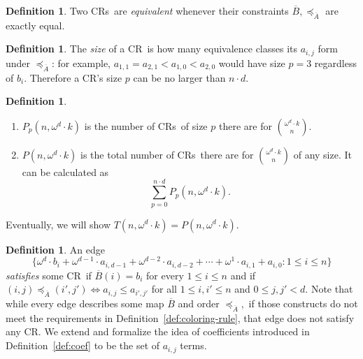 \documentclass[10pt,a4paper]{article}
\newcommand{\om}{\omega}
\newcommand{\crulenospace}{CR}
\newcommand{\crule}{\crulenospace~}
\newcommand{\crules}{\crulenospace s~}
\newcommand{\xleq}{\preceq_{\overline{A}}}
\newcommand{\assny}{\overline{B}}
\newcommand{\numpoints}{n}
\newcommand{\inumpoints}{i}
\newcommand{\idegr}{j}
\newcommand{\commonconst}{a}
\newcommand{\rareconst}{b}
\theoremstyle{plain}
\theoremstyle{definition}
\newtheorem{definition}[theorem]{Definition}
\begin{document}
\begin{definition}\label{def:crule-equivalence}
    Two \crules are \textit{equivalent} whenever their constraints $\assny, \xleq$ are
    exactly equal.
\end{definition}

\begin{definition} 
The \textit{size} of a \crule is how many equivalence classes its $\commonconst_{\inumpoints,\idegr}$ form under $\xleq$: 
for example, $\commonconst_{1, 1} = \commonconst_{2, 1} < \commonconst_{1, 0} < \commonconst_{2, 0}$ would have size $p=3$ regardless of $\rareconst_{\inumpoints}$. Therefore a \crulenospace's size $p$ can be no larger than $\numpoints \cdot d$.
\end{definition}
\begin{definition}~
\begin{enumerate}
\item 
$P_p \left(\numpoints,\om^d \cdot k \right)$ is the number of \crules of size $p$ there are for $\binom{\omega^d \cdot k}{\numpoints}$. 
\item 
$P\left(\numpoints,\om^d \cdot k\right)$ is the total number of \crules there are for $\binom{\omega^d \cdot k}{\numpoints}$ of any size. It can be calculated as $$
\sum_{p=0}^{\numpoints \cdot d} P_p(\numpoints, \om^d \cdot k).
$$
\end{enumerate}
\end{definition}
Eventually,
we will show $T(\numpoints,\om^d \cdot k) = P(\numpoints,\om^d \cdot k)$.

\begin{definition}\label{def:crule-coef}
An edge $$\{\om^d \cdot \rareconst_{\inumpoints} + \om^{d-1} \cdot \commonconst_{\inumpoints,d-1} + \om^{d-2} \cdot \commonconst_{\inumpoints,d-2} + \cdots + \om^1 \cdot \commonconst_{\inumpoints,1} + \commonconst_{\inumpoints,0} \colon 1 \leq \inumpoints \leq \numpoints\}$$
\textit{satisfies} some \crule if $\assny(\inumpoints) = \rareconst_{\inumpoints}$ for every $1 \leq \inumpoints \leq \numpoints$ and if 
$(\inumpoints,\idegr) \xleq (\inumpoints',\idegr') \iff \commonconst_{\inumpoints,\idegr} \leq \commonconst_{\inumpoints',\idegr'}$ for all $1 \leq \inumpoints,\inumpoints' \leq \numpoints$ and $0 \leq \idegr, \idegr' < d.$
Note that while every edge describes some map $\assny$ and order $\xleq,$ if those constructs
do not meet the requirements in Definition~\ref{def:coloring-rule},
that edge does not satisfy any \crulenospace. We extend and formalize the idea of
coefficients introduced in Definition~\ref{def:coef} to be the set of
$a_{i,j}$ terms.
\end{definition}
\end{document}
